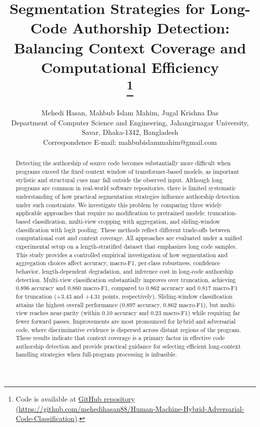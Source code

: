 \documentclass[conference]{IEEEtran}
\begin{document}

\title{\LARGE
Segmentation Strategies for Long-Code Authorship Detection: Balancing Context Coverage and Computational Efficiency\\
\thanks{Code is available at \href{https://github.com/mehedihasan88/Human-Machine-Hybrid-Adversarial-Code-Classification}{GitHub repository (https://github.com/mehedihasan88/Human-Machine-Hybrid-Adversarial-Code-Classification)}.}
}

\author{Mehedi Hasan, Mahbub Islam Mahim, Jugal Krishna Das\\
Department of Computer Science and Engineering, Jahangirnagar University, Savar, Dhaka-1342, Bangladesh\\
Correspondence E-mail: mahbubislammahim@gmail.com
}




\maketitle

\begin{abstract}
Detecting the authorship of source code becomes substantially more difficult when programs exceed the fixed context window of transformer-based models, as important stylistic and structural cues may fall outside the observed input. Although long programs are common in real-world software repositories, there is limited systematic understanding of how practical segmentation strategies influence authorship detection under such constraints. We investigate this problem by comparing three widely applicable approaches that require no modification to pretrained models: truncation-based classification, multi-view cropping with aggregation, and sliding-window classification with logit pooling. These methods reflect different trade-offs between computational cost and context coverage. All approaches are evaluated under a unified experimental setup on a length-stratified dataset that emphasizes long code samples. This study provides a controlled empirical investigation of how segmentation and aggregation choices affect accuracy, macro-F1, per-class robustness, confidence behavior, length-dependent degradation, and inference cost in long-code authorship detection. Multi-view classification substantially improves over truncation, achieving 0.896 accuracy and 0.860 macro-F1, compared to 0.862 accuracy and 0.817 macro-F1 for truncation (+3.43 and +4.31 points, respectively). Sliding-window classification attains the highest overall performance (0.897 accuracy, 0.862 macro-F1), but multi-view reaches near-parity (within 0.10 accuracy and 0.23 macro-F1) while requiring far fewer forward passes. Improvements are most pronounced for hybrid and adversarial code, where discriminative evidence is dispersed across distant regions of the program. These results indicate that context coverage is a primary factor in effective code authorship detection and provide practical guidance for selecting efficient long-context handling strategies when full-program processing is infeasible.
\end{abstract}
\end{document}
